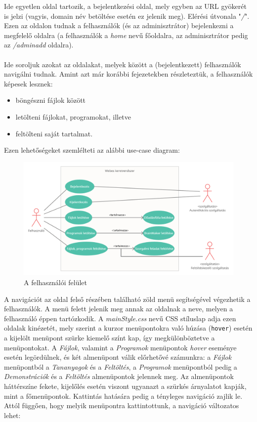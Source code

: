 Ide egyetlen oldal tartozik, a bejelentkezési oldal, mely egyben az URL gyökerét is jelzi (vagyis, domain név betöltése esetén ez jelenik meg). Elérési útvonala "\textit{/}". Ezen az oldalon tudnak a felhasználók (és az adminisztrátor) bejelenkezni a megfelelő oldalra (a felhasználók a \textit{home} nevű főoldalra, az adminisztrátor pedig az \textit{/adminadd} oldalra).\\

\\

Ide soroljuk azokat az oldalakat, melyek között a (bejelentkezett) felhasználók navigálni tudnak. Amint azt már korábbi fejezetekben részleteztük, a felhasználók képesek lesznek:

\begin{itemize}
\item{böngészni fájlok között}
\item{letölteni fájlokat, programokat, illetve}
\item{feltölteni saját tartalmat.}
\end{itemize}

Ezen lehetőségeket szemlélteti az alábbi use-case diagram:

\begin{figure}[h]
	\centering
		\includegraphics[width=15truecm, height=10truecm]{images/felhasznalo_use_case.png}
	\caption{A felhasználói felület}
	\label{fig:userusecase}
\end{figure}

A navigációt az oldal felső részében található zöld menü segítségével végezhetik a felhasználók. A menü felett jelenik meg annak az oldalnak a neve, melyen a felhasználó éppen tartózkodik. A \textit{mainStyle.css} nevű CSS stíluslap adja ezen oldalak kinézetét, mely szerint a kurzor menüpontokra való húzása (\texttt{hover}) esetén a kijelölt menüpont szürke kiemelő színt kap, így megkülönböztetve a menüpontokat. A \textit{Fájlok}, valamint a \textit{Programok} menüpontok \textit{hover} eseménye esetén legördülnek, és két almenüpont válik előrhetővé számunkra: a \textit{Fájlok} menüpontból a \textit{Tananyagok} és a \textit{Feltöltés}, a \textit{Programok} menüpontból pedig a \textit{Demonstrációk} és a \textit{Feltöltés} almenüpontok jelennek meg. Az almenüpontok háttérszíne fekete, kijelőlés esetén viszont ugyanazt a szürkés árnyalatot kapják, mint a főmenüpontok. Kattintás hatására pedig a tényleges navigáció zajlik le. Attól függően, hogy melyik menüpontra kattintottunk, a navigáció változatos lehet:


